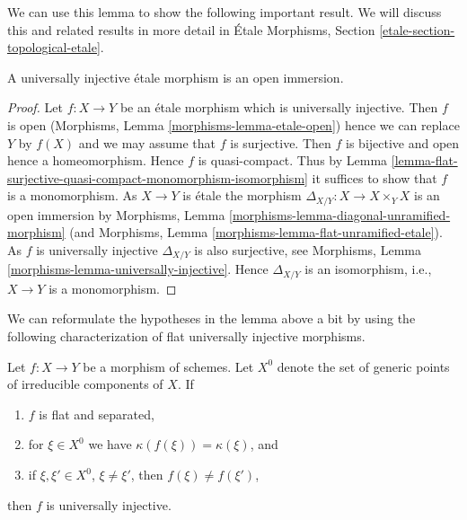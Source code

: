 \noindent
We can use this lemma to show the following important result.
We will discuss this and related results in more detail in
\'Etale Morphisms, Section \ref{etale-section-topological-etale}.

\begin{lemma}
\label{lemma-universally-injective-etale-open-immersion}
A universally injective \'etale morphism is an open immersion.
\end{lemma}

\begin{proof}
Let $f : X \to Y$ be an \'etale morphism which is universally injective.
Then $f$ is open
(Morphisms, Lemma \ref{morphisms-lemma-etale-open})
hence we can replace $Y$ by $f(X)$ and we may assume that $f$ is surjective.
Then $f$ is bijective and open hence a homeomorphism. Hence $f$ is
quasi-compact. Thus by
Lemma \ref{lemma-flat-surjective-quasi-compact-monomorphism-isomorphism}
it suffices to show that $f$ is a monomorphism. As $X \to Y$ is \'etale
the morphism $\Delta_{X/Y} : X \to X \times_Y X$ is an open immersion by
Morphisms, Lemma \ref{morphisms-lemma-diagonal-unramified-morphism}
(and
Morphisms, Lemma \ref{morphisms-lemma-flat-unramified-etale}).
As $f$ is universally injective $\Delta_{X/Y}$ is also surjective, see
Morphisms, Lemma \ref{morphisms-lemma-universally-injective}.
Hence $\Delta_{X/Y}$ is an isomorphism, i.e., $X \to Y$ is a monomorphism.
\end{proof}

\noindent
We can reformulate the hypotheses in the lemma above a bit by using the
following characterization of flat universally injective morphisms.

\begin{lemma}
\label{lemma-flat-universally-injective}
Let $f : X \to Y$ be a morphism of schemes. Let $X^0$ denote the set
of generic points of irreducible components of $X$. If
\begin{enumerate}
\item $f$ is flat and separated,
\item for $\xi \in X^0$ we have $\kappa(f(\xi)) = \kappa(\xi)$, and
\item if $\xi, \xi' \in X^0$, $\xi \not = \xi'$, then $f(\xi) \not = f(\xi')$,
\end{enumerate}
then $f$ is universally injective.
\end{lemma}

